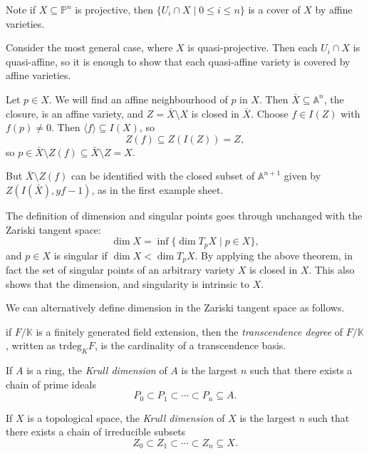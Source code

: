 \documentclass[12pt]{article}
\begin{document}
Note if $X \subseteq \mathbb{P}^n$ is projective, then $\{U_i \cap X \mid 0 \leq i \leq n\}$ is a cover of $X$ by affine varieties.

\begin{proofbox}
	Consider the most general case, where $X$ is quasi-projective. Then each $U_i \cap X$ is quasi-affine, so it is enough to show that each quasi-affine variety is covered by affine varieties.

	Let $p \in X$. We will find an affine neighbourhood of $p$ in $X$. Then $\bar X \subseteq \mathbb{A}^n$, the closure, is an affine variety, and $Z = \bar X \setminus X$ is closed in $\bar X$. Choose $f \in I(Z)$ with $f(p) \neq 0$. Then $\langle f \rangle \subseteq I(X)$, so
	\[
	Z(f) \subseteq Z(I(Z)) = Z,
	\]
	so $p \in \bar X \setminus Z(f) \subseteq \bar X \setminus Z = X$.

	But $\bar X \setminus Z(f)$ can be identified with the closed subset of $\mathbb{A}^{n+1}$ given by $Z(I(\bar X), yf - 1)$, as in the first example sheet.
\end{proofbox}

\begin{remark}
	The definition of dimension and singular points goes through unchanged with the Zariski tangent space:
	\[
		\dim X = \inf\{ \dim T_p X \mid p \in X\},
	\]
	and $p \in X$ is singular if $\dim X < \dim T_p X$. By applying the above theorem, in fact the set of singular points of an arbitrary variety $X$ is closed in $X$. This also shows that the dimension, and singularity is intrinsic to $X$.
\end{remark}

We can alternatively define dimension in the Zariski tangent space as follows.

\begin{definition}
	if $F / \mathbb{K}$ is a finitely generated field extension, then the \emph{transcendence degree} of $F / \mathbb{K}$, written as $\mathrm{trdeg}_K F$, is the cardinality of a transcendence basis.
\end{definition}

\begin{definition}
	If $A$ is a ring, the \emph{Krull dimension} of $A$ is the largest $n$ such that there exists a chain of prime ideals
	\[
	P_0 \subset P_1 \subset \cdots \subset P_n \subseteq A.
	\]
\end{definition}

\begin{definition}
	If $X$ is a topological space, the \emph{Krull dimension} of $X$ is the largest $n$ such that there exists a chain of irreducible subsets
	\[
	Z_0 \subset Z_1 \subset \cdots \subset Z_n \subseteq X.
	\]
\end{definition}
\end{document}

